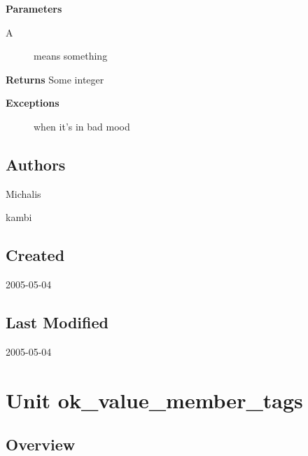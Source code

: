 \documentclass{report}
\begin{document}
\begin{list}{}
  \par
\item[\textbf{Parameters}]
\begin{description}
\item[A] means something
\end{description}
\item[\textbf{Returns}]Some integer
\item[\textbf{Exceptions}]
\begin{description}
\item[\begin{ttfamily}EFoo\end{ttfamily}(\ref{ok_tag_params_no_parens.EFoo})] when it's in bad mood
\end{description}


\end{list}
\section{Authors}
\par
Michalis

\par
kambi

\section{Created}
\par
2005{-}05{-}04


\section{Last Modified}
\par
2005{-}05{-}04


\chapter{Unit ok{\_}value{\_}member{\_}tags}
\label{ok_value_member_tags}
\section{Overview}
\begin{description}
\item[\texttt{\begin{ttfamily}TMyClass\end{ttfamily} Class}]
\item[\texttt{\begin{ttfamily}TMyRecord\end{ttfamily} Record}]
\end{description}
\end{document}
